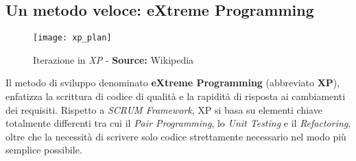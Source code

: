 \documentclass[../main.tex]{subfiles}
\begin{document}
        	\subsection{Un metodo veloce: eXtreme Programming}
        	
        		\begin{figure}[h]
        			\centering
        			\texttt{[image: xp\_plan]}
        			\caption{Iterazione in \emph{XP} - \textbf{Source:} Wikipedia}
        			\label{fig:xp_plan}
        		\end{figure}
        	
        		Il metodo di sviluppo denominato \textbf{eXtreme Programming}\cite{xp} (abbreviato \textbf{XP}), enfatizza la scrittura di codice di qualità e la rapidità di risposta ai cambiamenti dei requisiti. Rispetto a \emph{SCRUM Framework}, XP si basa su elementi chiave totalmente differenti tra cui il \emph{Pair Programming}, lo \emph{Unit Testing} e il \emph{Refactoring}, oltre che la necessità di scrivere solo codice strettamente necessario nel modo più semplice possibile.
        		
\end{document}
